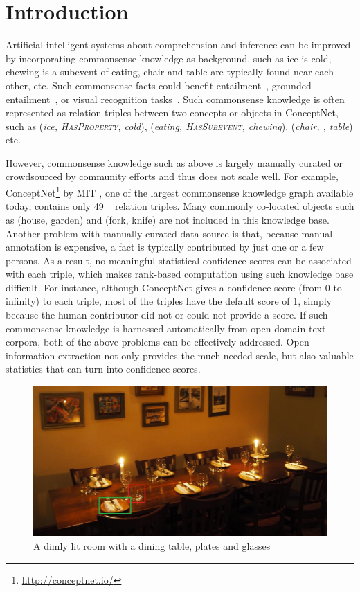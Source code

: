 \section{Introduction}
Artificial intelligent systems about comprehension and inference 
can be improved by incorporating commonsense knowledge as background, 
such as ice is cold, 
chewing is a subevent of eating, 
chair and table are typically found near each other, etc. 
Such commonsense facts could benefit entailment~\cite{dagan2009recognizing}, grounded entailment~\cite{bowman2015large}, or visual recognition tasks~\cite{zhu2014reasoning}.
Such commonsense knowledge is often represented as relation triples
between two concepts or objects in ConceptNet, 
such as (\textit{ice, \textsc{HasProperty}, cold}), 
(\textit{eating, \textsc{HasSubevent}, chewing}), 
(\textit{chair, \lnear, table}) etc. 

However, commonsense knowledge such as above is largely manually curated
or crowdsourced by community efforts and thus does not scale well.
For example, ConceptNet\footnote{\url{http://conceptnet.io/}} by MIT \cite{speer2012representing}, one of the largest commonsense
knowledge graph available today, contains only 49 \lnear~
relation triples. 
Many commonly co-located objects such as (house, garden) and 
(fork, knife) are not included in this knowledge base. 
Another problem with manually curated data source is that, because manual
annotation is expensive, a fact is typically contributed by just one 
or a few persons. 
As a result, no meaningful statistical confidence scores can be
associated with each triple, which makes rank-based 
computation using such knowledge base difficult. 
For instance, although ConceptNet gives a confidence
score (from 0 to infinity) to each triple, most of the triples have the default
score of 1, simply because the human contributor did not or could not 
provide a score. 
If such commonsense knowledge is harnessed automatically
from open-domain text corpora, both of the above problems can be 
effectively addressed. 
Open information extraction not only provides the much needed scale,
but also valuable statistics that can turn into confidence scores.

\begin{figure}[th]
\center
\includegraphics[width=\columnwidth]{dim-table.jpg}
\caption{A dimly lit room with a dining table, plates and glasses}
\label{fig:dim}
\end{figure}

